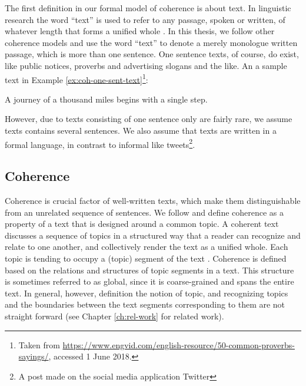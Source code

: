 The first definition in our formal model of coherence is about text. 
In linguistic research the word ``text'' is used to refer to any passage, spoken or written, of whatever length that forms a unified whole \cite{halliday76}. 
In this thesis, we follow other coherence models \cite{barzilay08,guinaudeau13} and use the word ``text'' to denote a merely monologue written passage, which is more than one sentence.
One sentence texts, of course, do exist, like public notices, proverbs and advertising slogans and the like. 
An a sample text in Example \ref{ex:coh-one-sent-text}\footnote{Taken from \url{https://www.engvid.com/english-resource/50-common-proverbs-sayings/}, accessed 1 June 2018.}: 

\begin{examples}
    \label{ex:coh-one-sent-text}
    A journey of a thousand miles begins with a single step.
\end{examples}

However, due to texts consisting of one sentence only are fairly rare, we assume texts contains several sentences.  
We also assume that texts are written in a formal language, in contrast to informal like tweets\footnote{A post made on the social media application Twitter}. 

\subsection{Coherence}

Coherence is crucial factor of well-written texts, which make them distinguishable from an unrelated sequence of sentences. 
We follow  and define coherence as a property of a text that is designed around a common topic. 
A coherent text discusses a sequence of topics in a structured way that a reader can recognize and relate to one another, and collectively render the text as a unified whole. 
Each topic is tending to occupy a (topic) segment of the text \cite{hearst97}.  
Coherence is defined based on the relations and structures of topic segments in a text. 
This structure is sometimes referred to as global, since it is coarse-grained and spans the entire text. 
In general, however, definition the notion of topic, and recognizing topics and the boundaries between the text segments corresponding to them are not straight forward \cite{stede12} (see Chapter \ref{ch:rel-work} for related work). 

